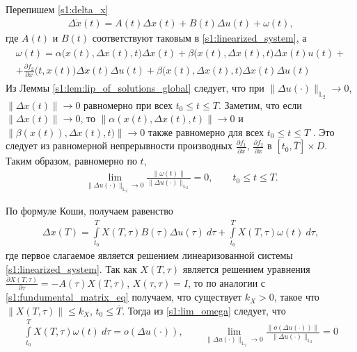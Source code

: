 \documentclass[../main.tex]{subfiles}
\begin{document}
Перепишем \eqref{s1:delta_x}
\begin{gather}\label{s1:delta_x_rewritten}
    \Delta \dot{x}(t) =
    A(t) \Delta x(t)  + 
    B(t) \Delta u(t)  + 
    \omega(t),
\end{gather}
где $A(t)$ и $B(t)$ соответствуют таковым в \eqref{s1:linearized_system}, а
\begin{gather*}
\begin{gathered}
    \omega(t) = 
    \alpha\big(x(t),\Delta x(t), t\big) \Delta x(t)  + 
    \beta\big(x(t),\Delta x(t), t\big)  \Delta x(t) u(t)  + \\ +
    \frac{\partial f_2}{\partial x} \Big(t, x(t)\Big) \Delta x(t) \Delta u(t) + 
    \beta\Big(x(t),\Delta x(t), t\Big) \Delta x(t) \Delta u(t) 
\end{gathered}    
\end{gather*}
Из Леммы \ref{s1:lem:lip_of_solutions_global} следует, что при $\|\Delta u(\cdot)\|_{\mathbb{L}_2} \to 0$, $\|\Delta x(t)\| \to 0$ равномерно при всех $t_0 \leqslant t \leqslant T$.
Заметим, что если $\|\Delta x(t)\| \to 0$, то $ \left\|  \alpha(x(t),\Delta x(t), t) \right\|  \to 0 $ и $ \left\|  \beta(x(t)),\Delta x(t), t) \right\|  \to 0 $ также равномерно для всех  $ t_0 \leqslant t \leqslant T $ .
Это следует из равномерной непрерывности производных $\frac{\partial f_1}{\partial x}$, $\frac{\partial f_2}{\partial x}$ в $[t_0, \overline{T}] \times D$.
Таким образом, равномерно по $t$,
\begin{gather}\label{s1:lim_omega}
    \lim\limits_{\|\Delta u(\cdot) \|_{\mathbb{L}_2} \to 0}  \frac{ \| \omega(t) \| }{\|\Delta u(\cdot) \|_{\mathbb{L}_2}}  = 0, \qquad  t_0 \leqslant t \leqslant T .
\end{gather}
    
По формуле Коши, получаем равенство
\begin{gather*}
    \Delta x(T) = \int\limits_{t_0}^{T} X(T, \tau) B(\tau) \Delta u(\tau) \ d\tau + \int\limits_{t_0}^{T}  X(T, \tau) \omega(t) \ d\tau,
\end{gather*}
где первое слагаемое является решением линеаризованной системы \eqref{s1:linearized_system}.
Так как $X(T, \tau) $ является решением уравнения $\frac{\partial X(T, \tau) }{\partial \tau} = -A(\tau)X(T, \tau)$, $X(\tau, \tau) = I$, то по аналогии с \eqref{s1:fundumental_matrix_eq}  получаем, что существует $k_X > 0$, такое что $\|X(T, \tau) \| \leqslant k_X$, $t_0 \leqslant \overline{T} $.
Тогда из \eqref{s1:lim_omega} следует, что 
\begin{gather*}
    \int\limits_{t_0}^{T}  X(T, \tau) \omega(t) \ d\tau  = o(\Delta u(\cdot)), \qquad \lim\limits_{\|\Delta u(\cdot) \|_{\mathbb{L}_2} \to 0}  \frac{ \| o(\Delta u(\cdot)) \| }{\|\Delta u(\cdot) \|_{\mathbb{L}_2}}  = 0
\end{gather*}
    
\end{document}
